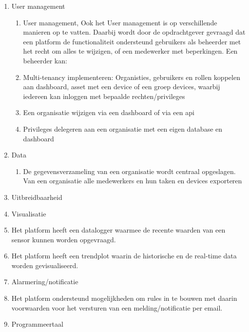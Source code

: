 \begin{enumerate}
	\item User management
	\begin{enumerate}
		\item User management, Ook het User management is op verschillende manieren op te vatten. Daarbij wordt door de opdrachtgever gevraagd dat een platform de functionaliteit ondersteund gebruikers als beheerder met het recht om alles te wijzigen, of een medewerker met beperkingen. Een beheerder kan:
		\item Multi-tenancy implementeren: Organisties, gebruikers en rollen koppelen aan dashboard, asset met een device of een groep devices, waarbij iedereen kan inloggen met bepaalde rechten/privileges
		\item Een organisatie wijzigen via een dashboard of via een api
		\item Privileges delegeren aan een organisatie met een eigen database en dashboard
	\end{enumerate}
	\item Data
	\begin{enumerate}
		\item De gegevensverzameling van een organisatie wordt centraal opgeslagen.
		Van een organisatie alle medewerkers en hun taken en devices exporteren
	\end{enumerate}
	\item Uitbreidbaarheid     

	\item Visualisatie
	\item Het platform heeft een datalogger waarmee de recente waarden van een sensor kunnen worden opgevraagd.
	\item Het platform heeft een trendplot waarin de historische en de real-time data worden gevisualiseerd.
	\item Alarmering/notificatie
	\item Het platform ondersteund mogelijkheden om rules in te bouwen met daarin voorwaarden voor het versturen van een melding/notificatie per email.
	\item Programmeertaal


\end{enumerate}
